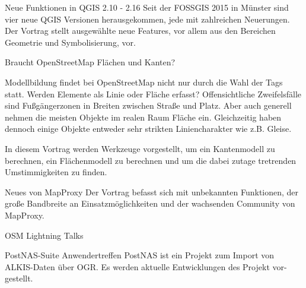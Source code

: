 %
{Neue Funktionen in QGIS 2.10 - 2.16}%
{}%
{Seit der FOSSGIS 2015 in Münster sind vier neue QGIS Versionen herausgekommen, jede mit zahlreichen Neuerungen. Der Vortrag stellt ausgewählte neue Features, vor allem aus den Bereichen Geometrie und Symbolisierung, vor.}

%
{Braucht OpenStreetMap Flächen und Kanten?}%
{}%
{Modellbildung findet bei OpenStreetMap nicht nur durch die Wahl der Tags statt.
Werden Elemente als Linie oder Fläche erfasst?
Offensichtliche Zweifelsfälle sind Fußgängerzonen in Breiten zwischen Straße und Platz.
Aber auch generell nehmen die meisten Objekte im realen Raum Fläche ein.
Gleichzeitig haben dennoch einige Objekte entweder sehr strikten Liniencharakter wie z.B. Gleise.

In diesem Vortrag werden Werkzeuge vorgestellt,
um ein Kantenmodell zu berechnen, ein Flächenmodell zu berechnen
und um die dabei zutage tretrenden Umstimmigkeiten zu finden.
}


%
{Neues von MapProxy}%
{}%
{Der Vortrag befasst sich mit unbekannten Funktionen, der große Bandbreite an Einsatzmöglichkeiten und der wachsenden Community von MapProxy.}


%
{OSM Lightning Talks}%
{}%
{}

%
{PostNAS-Suite Anwendertreffen}%
{}%
{PostNAS ist ein Projekt zum Import von ALKIS-Daten über
OGR. Es werden aktuelle Entwicklungen des Projekt vor-
gestellt.}\label{bof-montag}

% 

